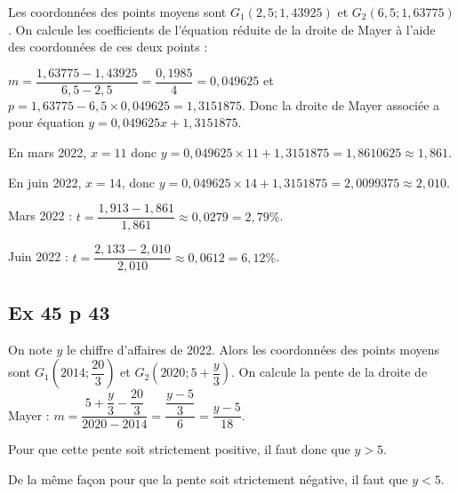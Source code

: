\documentclass[12pt,a4paper]{book}
\begin{document}
\begin{enumMet}
	\item 
	\begin{enumMet}
		\item Les coordonnées des points moyens sont $G_1(2,5;1,43925)$ et $G_2(6,5;1,63775)$. On calcule les coefficients de l'équation réduite de la droite de Mayer à l'aide des coordonnées de ces deux points : 
		
		$m=\dfrac{1,63775-1,43925}{6,5-2,5} = \dfrac{0,1985}{4} = 0,049625$ et $p=1,63775-6,5 \times 0,049625 = 1,3151875$. Donc la droite de Mayer associée a pour équation $y = 0,049625 x +1,3151875$.
		\item En mars 2022, $x=11$ donc $y = 0,049625 \times 11 +1,3151875 = 1,8610625 \approx 1,861$. 
		
		En juin 2022, $x=14$, donc $y = 0,049625 \times 14 +1,3151875 = 2,0099375 \approx 2,010$.
	\end{enumMet}
	\item Mars 2022 : $t =\dfrac{1,913-1,861}{1,861} \approx 0,0279 = 2,79 \%$.
	
	Juin 2022 : $t =\dfrac{2,133-2,010}{2,010} \approx 0,0612 = 6,12 \%$.
	
	
\end{enumMet}

\subsection*{Ex 45 p 43}


\begin{enumMet}
	\item On note $y$ le chiffre d'affaires de 2022. Alors les coordonnées des points moyens sont $G_1(2014;\dfrac{20}{3})$ et $G_2(2020;5+\dfrac{y}{3})$. On calcule la pente de la droite de Mayer : $m=\dfrac{5+\dfrac{y}{3} -  \dfrac{20}{3}}{2020-2014} = \dfrac{\dfrac{y-5}{3}}{6} = \dfrac{y-5}{18}$.
	
	Pour que cette pente soit strictement positive, il faut donc que $y>5$.
	\item De la même façon pour que la pente soit strictement négative, il faut que $y<5$.
	
	
\end{enumMet}
\end{document}
